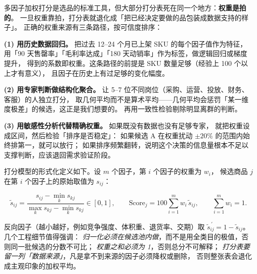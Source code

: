 多因子加权打分是选品的标准工具，但大部分打分表死在同一个地方：\textbf{权重是拍的}。
一旦权重靠拍，打分表就退化成「把已经决定要做的品包装成数据支持的样子」。
正确的权重来源有三条路径，按可信度排序：

\textbf{(1) 用历史数据回归。} 把过去 12--24 个月已上架 SKU 的每个因子值作为特征，
用「90 天售罄率」「毛利率达成」「180 天动销率」作为标签，做逻辑回归或梯度提升，
得到的系数即权重。这条路径的前提是 SKU 数量足够（经验上 100 个以上才有意义），
且因子在历史上有过足够的变化幅度。

\textbf{(2) 用专家判断做结构化聚合。} 让 5--7 位不同岗位（采购、运营、投放、财务、客服）的人独立打分，
取几何平均而不是算术平均——几何平均会惩罚「某一维度极差」的候选，这正是我们想要的。
再用一致性检验剔除明显离群的判断。

\textbf{(3) 用敏感性分析代替精确权重。} 如果既没有数据也没有足够专家，
就把权重设成区间，然后检验「排序是否稳定」：
如果候选 A 在权重扰动 $\pm 20\%$ 的范围内始终排第一，就可以放行；
如果排序频繁翻转，说明这个决策的信息量根本不足以支撑判断，应该退回需求验证阶段。

打分模型的形式化定义如下。设 $m$ 个因子，第 $i$ 个因子的权重为 $w_i$，
候选商品 $j$ 在第 $i$ 个因子上的原始取值为 $s_{ij}$：

\begin{equation}
\tilde{s}_{ij} = \frac{s_{ij} - \min_k s_{kj}}{\max_k s_{kj} - \min_k s_{kj}} \in [0,1],
\qquad
\text{Score}_j = 100\sum_{i=1}^{m} w_i\,\tilde{s}_{ij},
\qquad
\sum_{i=1}^{m} w_i = 1 .
\label{eq:scorecard}
\end{equation}

反向因子（越小越好，例如竞争强度、体积重、退货率、交期）取 $\tilde{s}^{\,\prime}_{ij} = 1 - \tilde{s}_{ij}$。
几个工程细节值得强调：
\emph{归一化必须在候选池内做}，而不是用全类目的极值，否则同一批候选的分数不可比；
\emph{权重之和必须为 1}，否则总分不可解释；
\emph{打分表要留一列「数据来源」}，凡是拿不到来源的因子必须降权或删除，
否则整张表会退化成主观印象的加权平均。

